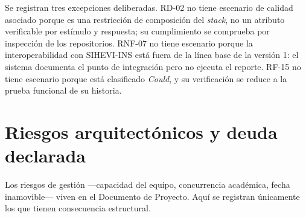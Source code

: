 \documentclass[11pt,a4paper]{article}
\begin{document}
Se registran tres excepciones deliberadas. RD-02 no tiene escenario de calidad asociado porque es una restricción de composición del \emph{stack}, no un atributo verificable por estímulo y respuesta; su cumplimiento se comprueba por inspección de los repositorios. RNF-07 no tiene escenario porque la interoperabilidad con SIHEVI-INS está fuera de la línea base de la versión 1: el sistema documenta el punto de integración pero no ejecuta el reporte. RF-15 no tiene escenario porque está clasificado \emph{Could}, y su verificación se reduce a la prueba funcional de su historia.

\section{Riesgos arquitectónicos y deuda declarada}
\label{sec:riesgos}

Los riesgos de gestión ---capacidad del equipo, concurrencia académica, fecha inamovible--- viven en el Documento de Proyecto. Aquí se registran únicamente los que tienen consecuencia estructural.
\end{document}
